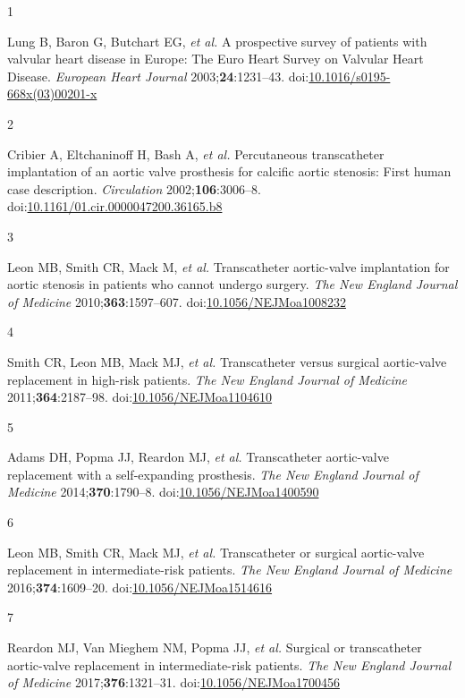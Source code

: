 \documentclass[
  12pt,
]{article}
\newlength{\cslhangindent}
\newlength{\csllabelwidth}
\newenvironment{CSLReferences}[2] %
 {\begin{list}{}{%
  \setlength{\itemindent}{0pt}
  \setlength{\leftmargin}{0pt}
  \setlength{\parsep}{0pt}
  \ifodd #1
   \setlength{\leftmargin}{\cslhangindent}
   \setlength{\itemindent}{-1\cslhangindent}
  \fi
  \setlength{\itemsep}{#2\baselineskip}}}
 {\end{list}}
\newcommand{\CSLLeftMargin}[1]{\parbox[t]{\csllabelwidth}{\strut#1\strut}}
\newcommand{\CSLRightInline}[1]{\parbox[t]{\linewidth - \csllabelwidth}{\strut#1\strut}}
\begin{document}
\label{refs}
\begin{CSLReferences}{0}{1}
\CSLLeftMargin{1 }%
\CSLRightInline{Lung B, Baron G, Butchart EG, \emph{et al.} A
prospective survey of patients with valvular heart disease in {Europe}:
The {Euro} {Heart} {Survey} on {Valvular} {Heart} {Disease}.
\emph{European Heart Journal} 2003;\textbf{24}:1231--43.
doi:\href{https://doi.org/10.1016/s0195-668x(03)00201-x}{10.1016/s0195-668x(03)00201-x}}

\CSLLeftMargin{2 }%
\CSLRightInline{Cribier A, Eltchaninoff H, Bash A, \emph{et al.}
Percutaneous transcatheter implantation of an aortic valve prosthesis
for calcific aortic stenosis: First human case description.
\emph{Circulation} 2002;\textbf{106}:3006--8.
doi:\href{https://doi.org/10.1161/01.cir.0000047200.36165.b8}{10.1161/01.cir.0000047200.36165.b8}}

\CSLLeftMargin{3 }%
\CSLRightInline{Leon MB, Smith CR, Mack M, \emph{et al.} Transcatheter
aortic-valve implantation for aortic stenosis in patients who cannot
undergo surgery. \emph{The New England Journal of Medicine}
2010;\textbf{363}:1597--607.
doi:\href{https://doi.org/10.1056/NEJMoa1008232}{10.1056/NEJMoa1008232}}

\CSLLeftMargin{4 }%
\CSLRightInline{Smith CR, Leon MB, Mack MJ, \emph{et al.} Transcatheter
versus surgical aortic-valve replacement in high-risk patients.
\emph{The New England Journal of Medicine} 2011;\textbf{364}:2187--98.
doi:\href{https://doi.org/10.1056/NEJMoa1104610}{10.1056/NEJMoa1104610}}

\CSLLeftMargin{5 }%
\CSLRightInline{Adams DH, Popma JJ, Reardon MJ, \emph{et al.}
Transcatheter aortic-valve replacement with a self-expanding prosthesis.
\emph{The New England Journal of Medicine} 2014;\textbf{370}:1790--8.
doi:\href{https://doi.org/10.1056/NEJMoa1400590}{10.1056/NEJMoa1400590}}

\CSLLeftMargin{6 }%
\CSLRightInline{Leon MB, Smith CR, Mack MJ, \emph{et al.} Transcatheter
or surgical aortic-valve replacement in intermediate-risk patients.
\emph{The New England Journal of Medicine} 2016;\textbf{374}:1609--20.
doi:\href{https://doi.org/10.1056/NEJMoa1514616}{10.1056/NEJMoa1514616}}

\CSLLeftMargin{7 }%
\CSLRightInline{Reardon MJ, Van Mieghem NM, Popma JJ, \emph{et al.}
Surgical or transcatheter aortic-valve replacement in intermediate-risk
patients. \emph{The New England Journal of Medicine}
2017;\textbf{376}:1321--31.
doi:\href{https://doi.org/10.1056/NEJMoa1700456}{10.1056/NEJMoa1700456}}


\end{CSLReferences}
\end{document}
